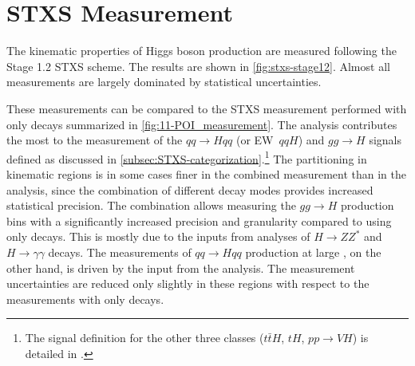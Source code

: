 \section{STXS Measurement}
The kinematic properties of Higgs boson production are measured following the Stage 1.2 STXS scheme. 
The results are shown in \cref{fig:stxs-stage12}. 
Almost all measurements are largely dominated by statistical uncertainties. 

These measurements can be compared to the STXS measurement performed with only \HWW decays summarized in \cref{fig:11-POI_measurement}. 
The \HWW analysis contributes the most to the measurement of the $qq\to Hqq$ (or EW~$qqH$) and $gg \to H$ signals defined as discussed in \cref{subsec:STXS-categorization}.\footnote{The signal definition for the other three classes ($t\bar{t}H$, $tH$, $pp\to VH$) is detailed in .}
The partitioning in kinematic regions is in some cases finer in the combined measurement than in the \HWW analysis, since the combination of different decay modes provides increased statistical precision.
The combination allows measuring the $gg \to H$ production bins with a significantly increased precision and granularity compared to using only \HWW decays. 
This is mostly due to the inputs from analyses of $H \to ZZ^*$ and $H \to \gamma\gamma$ decays.
The measurements of $qq\to Hqq$ production at large \mjj, on the other hand, is driven by the input from the \HWW analysis. The measurement uncertainties are reduced only slightly in these regions with respect to the measurements with only \HWW decays.

